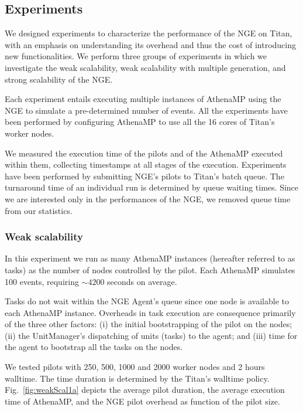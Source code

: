 \subsection{Experiments}
\label{sec:ngeExp}

We designed experiments to characterize the performance of the NGE on Titan,
with an emphasis on understanding its overhead and thus the cost of introducing
new functionalities.  We perform three groups of experiments in which we
investigate the weak scalability, weak scalability with multiple generation, and
strong scalability of the NGE.

Each experiment entails executing multiple instances of AthenaMP using the NGE
to simulate a pre-determined number of events. All the experiments have been
performed by  configuring AthenaMP to use all the 16 cores  of Titan's worker
nodes.

We  measured the execution time of the pilots and of the AthenaMP  executed
within them, collecting timestamps at  all stages of the execution. Experiments
have been performed  by  submitting NGE's pilots  to Titan's batch queue.  The
turnaround time of an individual run is determined by queue waiting times. Since
we are interested only in the performances of the NGE, we removed queue time
from our statistics.

\subsubsection{Weak scalability}

In this experiment  we run as many AthenaMP instances (hereafter referred to as
tasks)  as the number of nodes controlled by the pilot. Each AthenaMP simulates
100 events, requiring $\sim 4200$ seconds on average.

Tasks do not  wait within the NGE Agent's queue since  one node  is available to
each AthenaMP instance.  Overheads in task execution are consequence primarily
of the three other factors: (i) the  initial bootstrapping of the pilot on the
nodes; (ii) the UnitManager's dispatching of  units (tasks) to the agent; and
(iii) time for the agent to bootstrap all the tasks on the nodes.

We tested  pilots  with 250, 500, 1000 and 2000 worker nodes and 2 hours
walltime. The time duration is determined by the Titan's walltime policy.
Fig.~\ref{fig:weakScal1a} depicts the average pilot duration, the average
execution time of AthenaMP, and the NGE pilot overhead as function of the pilot
size.

